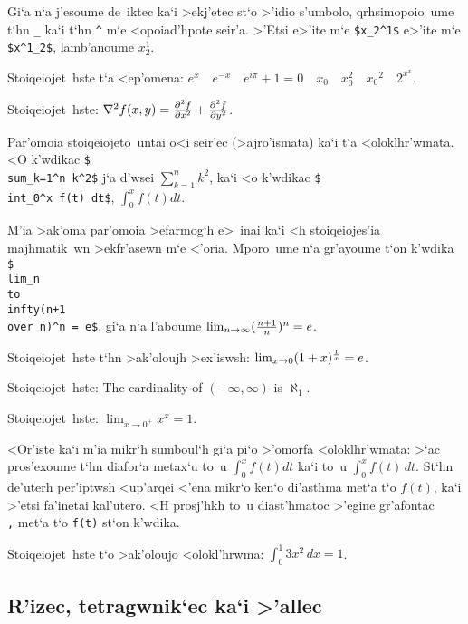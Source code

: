 Gi`a n`a j'esoume de~iktec ka`i >ekj'etec st`o >'idio s'umbolo,
qrhsimopoio~ume t`hn {\tt \_{}} ka`i t`hn {\tt \^{}} m`e <opoiad'hpote
seir'a.  >'Etsi e>'ite m`e {\tt \$x\_{}2\^{}1\$} e>'ite m`e
{\tt\$x\^{}1\_{}2\$}, lamb'anoume $x_2^1$.

\exercise Stoiqeiojet~hste t`a <ep'omena: $e^x \quad e^{-x} \quad  
e^{i\pi}+1=0 \quad x_0 \quad x_0^2 \quad {x_0}^2 \quad 2^{x^x}$.

\exercise Stoiqeiojet~hste:  $\nabla^2 f(x,y) = {\partial^2 f
\over\partial x^2} + {\partial^2 f \over\partial y^2}$.
\bigskip

Par'omoia stoiqeiojeto~untai o<i seir'ec (>ajro'ismata) ka`i t`a
<oloklhr'wmata.  <O k'wdikac {\tt \$\\sum\_{}\lb k=1\rb\^{}n k\^{}2\$}
j`a d'wsei $\sum_{k=1}^n k^2$, ka`i <o k'wdikac {\tt \$\\int\_{}0\^{}x
f(t) dt\$}, $\int_0^x f(t) dt$.%

M'ia >ak'oma par'omoia >efarmog`h e>~inai ka`i <h stoiqeiojes'ia
majhmatik~wn >ekfr'asewn m`e <'oria.  Mporo~ume n`a gr'ayoume t`on
k'wdika {\tt \$\\lim\_\lb n\\to \\infty\rb (\lb n+1 \\over n\rb)\^{}n =
e\$}, gi`a n`a l'aboume $\lim_{n\to \infty} ({n+1\over n})^n = e$.

\exercise Stoiqeiojet~hste t`hn >ak'oloujh >ex'iswsh: $\lim_{x\to 0}
(1+x)^{1\over x}=e$.

\exercise Stoiqeiojet~hste: {\rm The cardinality of $(-\infty, \infty)$
is $\aleph_1$.   }

\exercise Stoiqeiojet~hste: $\lim_{x\to {0^+}} x^x = 1$.
\bigskip

<Or'iste ka`i m'ia mikr`h sumboul`h gi`a pi`o >'omorfa <oloklhr'wmata: 
>`ac pros'exoume t`hn diafor`a metax`u to~u  $\int_0^x f(t) dt$ ka`i
to~u $\int_0^x f(t)\, dt$\null.  St`hn de'uterh per'iptwsh <up'arqei
<'ena mikr`o ken`o di'asthma met`a t`o $f(t)$, ka`i >'etsi fa'inetai
kal'utero. <H prosj'hkh to~u diast'hmatoc >'egine gr'afontac {\tt\\,}
met`a t`o {\tt f(t)} st`on k'wdika.                    
\toindex{,}
                    
\exercise Stoiqeiojet~hste t`o >ak'oloujo <olokl'hrwma: $\int_0^1
3x^2\,dx = 1$.

\subsection{R'izec, tetragwnik`ec ka`i >'allec}
                   
